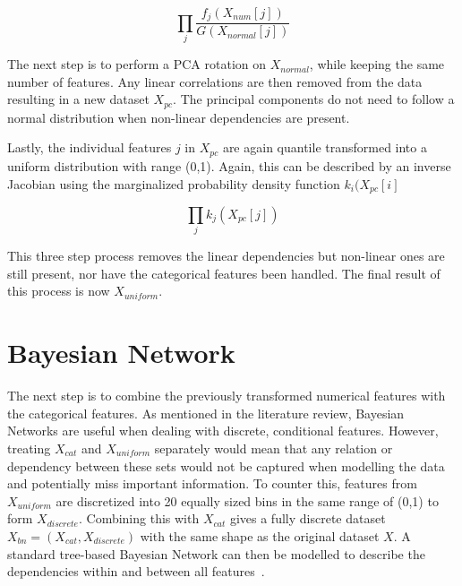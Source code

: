 \begin{equation}
    \prod_{j} \frac{f_j(X_{num}[j])}{G(X_{normal}[j])}
\end{equation}

The next step is to perform a PCA rotation on $X_{normal}$, while keeping the same number of features. Any linear correlations are then removed from the data resulting in a new dataset $X_{pc}$. The principal components do not need to follow a normal distribution when non-linear dependencies are present.

Lastly, the individual features $j$ in $X_{pc}$ are again quantile transformed into a uniform distribution with range (0,1). Again, this can be described by an inverse Jacobian using the marginalized probability density function $k_i(X_{pc}[i]$

\begin{equation}
    \prod_j k_j (X_{pc}[j])
\end{equation}

This three step process removes the linear dependencies but non-linear ones are still present, nor have the categorical features been handled. The final result of this process is now $X_{uniform}$.

\section{Bayesian Network}
The next step is to combine the previously transformed numerical features with the categorical features. As mentioned in the literature review, Bayesian Networks are useful when dealing with discrete, conditional features. However, treating $X_{cat}$ and $X_{uniform}$ separately would mean that any relation or dependency between these sets would not be captured when modelling the data and potentially miss important information. To counter this, features from $X_{uniform}$ are discretized into 20 equally sized bins in the same range of (0,1) to form $X_{discrete}$. Combining this with $X_{cat}$ gives a fully discrete dataset $X_{bn} = (X_{cat}, X_{discrete})$ with the same shape as the original dataset $X$. A standard tree-based Bayesian Network can then be modelled to describe the dependencies within and between all features~\cite{Chow1968ApproximatingTrees}.


